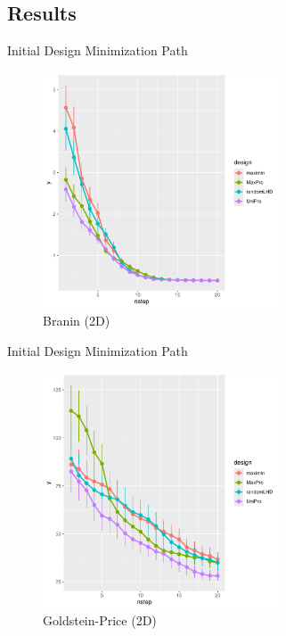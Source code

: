 \documentclass{beamer}
\begin{document}
\subsection{Results}
\begin{frame}{Initial Design Minimization Path}
\begin{figure}
\centering
\includegraphics[height=7cm]{../chapters/EGO/pdfs/branin_lineplot1}
\caption{Branin (2D)}
\end{figure}
\end{frame}

\begin{frame}{Initial Design Minimization Path}
\begin{figure}
\centering
\includegraphics[height=7cm]{../chapters/EGO/pdfs/goldpr_lineplot1}
\caption{Goldstein-Price (2D)}
\end{figure}
\end{frame}

\end{document}
